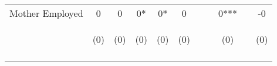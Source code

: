 \begin{tabular}{lcccccccccc}
\noalign{\smallskip}Mother Employed & 0 & 0 & 0* & 0* & 0 &  &  & 0*** &  & -0\\
 & \begin{footnotesize}(0)\end{footnotesize} & \begin{footnotesize}(0)\end{footnotesize} & \begin{footnotesize}(0)\end{footnotesize} & \begin{footnotesize}(0)\end{footnotesize} & \begin{footnotesize}(0)\end{footnotesize} & \begin{footnotesize}\end{footnotesize} & \begin{footnotesize}\end{footnotesize} & \begin{footnotesize}(0)\end{footnotesize} & \begin{footnotesize}\end{footnotesize} & \begin{footnotesize}(0)\end{footnotesize}\\
\noalign{\smallskip}\hline\end{tabular}\\
